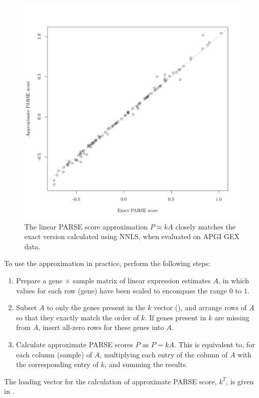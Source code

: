 \begin{figure}
\centering
\includegraphics[width=.7\linewidth]{analysis/biosurv/reports/18_SIS_diag_dsd_final/figure/approx-calc-1}
\caption[Performance of the \acrshort{PARSE} score approximation]{The linear \acrshort{PARSE} score approximation $P \approx k A$ closely matches the exact version calculated using \gls{NNLS}, when evaluated on \gls{APGI} \gls{GEX} data.}\label{fig:app-parse-approx-matching}
\end{figure}

To use the approximation in practice, perform the following steps:
\begin{enumerate}
  \item Prepare a gene $\times$ sample matrix of linear expression estimates $A$, in which values for each row (gene) have been scaled to encompass the range $0$ to $1$.
  \item Subset $A$ to only the genes present in the $k$ vector (), and arrange rows of $A$ so that they exactly match the order of $k$.  If genes present in $k$ are missing from $A$, insert all-zero rows for these genes into $A$.
  \item Calculate approximate \gls{PARSE} scores $P$ as $P = k A$.  This is equivalent to, for each column (sample) of $A$, multiplying each entry of the column of $A$ with the corresponding entry of $k$, and summing the results.
\end{enumerate}

The loading vector for the calculation of approximate \gls{PARSE} score, $k^T$, is given in .

